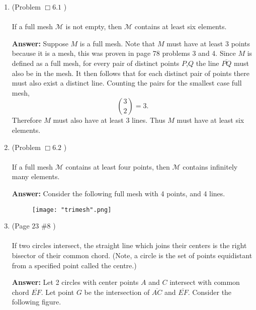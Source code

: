 \documentclass[12pt]{amsart}
\theoremstyle{remark}
\theoremstyle{mycomment}
\begin{document}
\thispagestyle{fancy}

\begin{enumerate}

\item(Problem $\Box 6.1$ )\\
\\
 If a full mesh $\mathcal{M}$ is not empty, then $\mathcal{M}$ contains at least six elements.

\textbf{Answer:} Suppose $M$ is a full mesh. Note that $M$ must have at least 3 points because it is a mesh, this was proven in page 78 problems 3 and 4. Since $M$ is defined as a full mesh, for every pair of distinct points $P$,$Q$ the line $\overline{PQ}$ must also be in the mesh. It then follows that for each distinct pair of points there must also exist a distinct line. Counting the pairs for the smallest case full mesh, 
\begin{equation}
{3 \choose 2} = 3.
\end{equation}
Therefore $M$ must also have at least 3 lines. Thus $M$ must have at least six elements. 
\vspace{1in}

\item(Problem $\Box 6.2$ )\\
\\
 If a full mesh $\mathcal{M}$ contains at least four points, then $\mathcal{M}$ contains infinitely many elements.

\textbf{Answer:} Consider the following full mesh with 4 points, and 4 lines.

\begin{figure}[H]
\caption{}
\centering
\texttt{[image: "trimesh".png]}
\end{figure}


\vspace{1in}

\item(Page $23$ $\#8$ )\\
\\
 If two circles intersect, the straight line which joins their centers is the right bisector of their common chord. (Note, a circle is the set of points equidistant from a specified point called the centre.)

\textbf{Answer:} Let 2 circles with center points $A$ and $C$ intersect with common chord $\overline{EF}$. Let point $G$ be the intersection of $\overline{AC}$  and $\overline{EF}$. Consider the following figure.


\end{enumerate}
\end{document}
